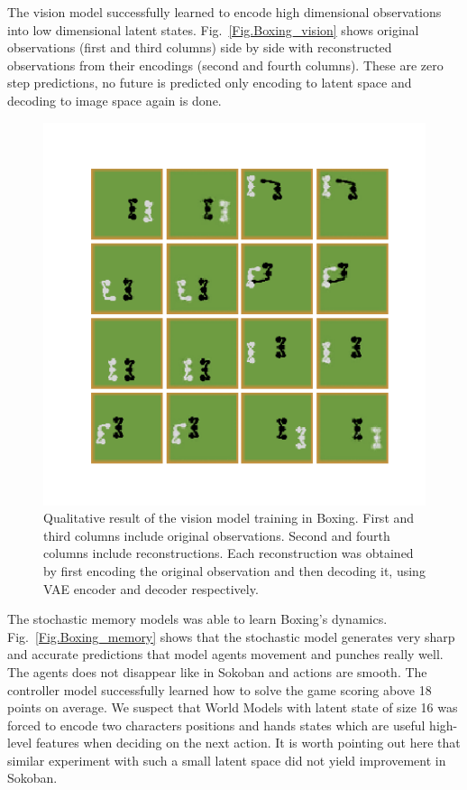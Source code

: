 The vision model successfully learned to encode high dimensional observations into low dimensional latent states. Fig.~\ref{Fig.Boxing_vision} shows original observations (first and third columns) side by side with reconstructed observations from their encodings (second and fourth columns). These are zero step predictions, no future is predicted only encoding to latent space and decoding to image space again is done.

\begin{figure}[H]
\includegraphics[width=1\textwidth,keepaspectratio]{figures/Boxing_vision.png}
\caption[Qualitative result of the vision model training in Boxing]{Qualitative result of the vision model training in Boxing. First and third columns include original observations. Second and fourth columns include reconstructions. Each reconstruction was obtained by first encoding the original observation and then decoding it, using VAE encoder and decoder respectively.}
\label{Fig.Sokoban_vision}
\end{figure}

The stochastic memory models was able to learn Boxing’s dynamics. Fig.~\ref{Fig.Boxing_memory} shows that the stochastic model generates very sharp and accurate predictions that model agents movement and punches really well. The agents does not disappear like in Sokoban and actions are smooth.
The controller model successfully learned how to solve the game scoring above 18 points on average. We suspect that World Models with latent state of size 16 was forced to encode two characters positions and hands states which are useful high-level features when deciding on the next action. It is worth pointing out here that similar experiment with such a small latent space did not yield improvement in Sokoban.

